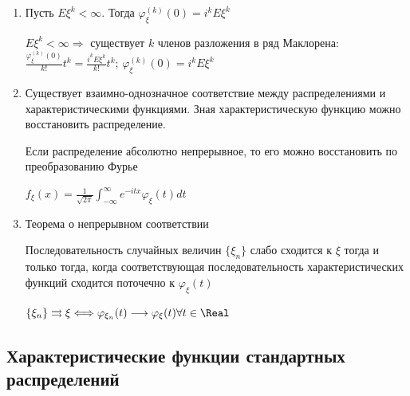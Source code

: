 \begin{enumerate}
    \item Пусть $E\xi^k < \infty$. Тогда $\varphi_\xi^{(k)}(0) = i^k E\xi^k$

    \begin{MyProof}
        $E\xi^k < \infty \Longrightarrow$ существует $k$ членов разложения в ряд Маклорена: 
        $\frac{\varphi_\xi^{(k)}(0)}{k!}t^k = \frac{i^k E\xi^k}{k!} t^k$; $\varphi_\xi^{(k)}(0) = i^k E\xi^k$
    \end{MyProof}

    \item Существует взаимно-однозначное соответствие между распределениями и характеристическими функциями.
    Зная характеристическую функцию можно восстановить распределение.

    \Ex Если распределение абсолютно непрерывное, то его можно восстановить по преобразованию Фурье

    $f_\xi(x) = \frac{1}{\sqrt{2\pi}} \int_{-\infty}^{\infty} e^{-itx} \varphi_\xi(t) dt$

    \item Теорема о непрерывном соответствии
    
    \begin{MyTheorem}
        \Ths Последовательность случайных величин $\{\xi_n\}$ слабо сходится к $\xi$ тогда и только тогда, когда
        соответствующая последовательность характеристических функций сходится поточечно к $\varphi_\xi(t)$

        $\{\xi_n\} \rightrightarrows \xi \Longleftrightarrow \varphi_{\xi_n}(t) \longrightarrow \varphi_\xi(t) \forall t \in \Real$
    \end{MyTheorem}

\end{enumerate}

\subsection{Характеристические функции стандартных распределений}

\hypertarget{characteristicfunctionofstandarddistributions}{}


